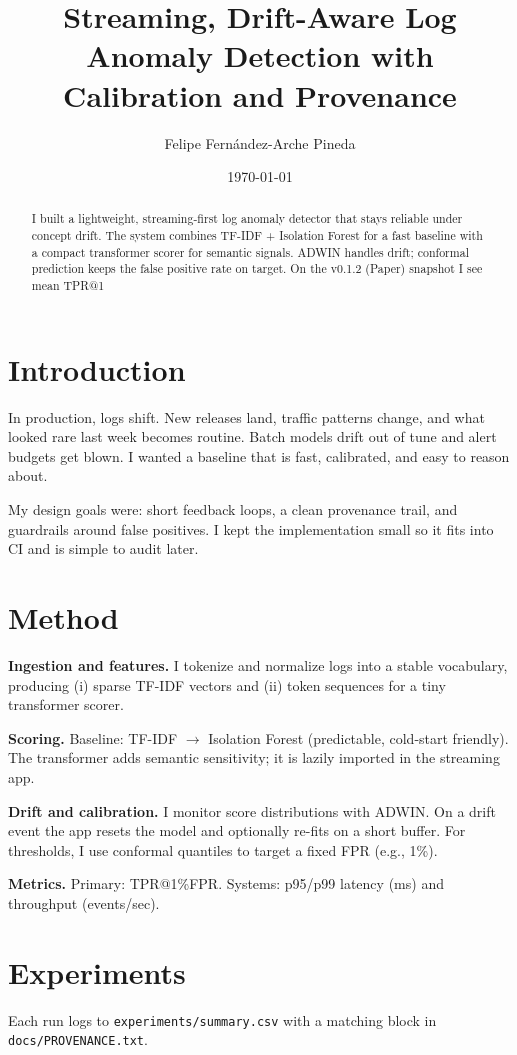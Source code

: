 \documentclass[11pt,twocolumn]{article}
\title{Streaming, Drift-Aware Log Anomaly Detection with Calibration and Provenance}
\author{Felipe Fernández-Arche Pineda}
\date{\today}
\begin{document}
\maketitle

\begin{abstract}
I built a lightweight, streaming-first log anomaly detector that stays reliable under concept drift. The system combines TF-IDF + Isolation Forest for a fast baseline with a compact transformer scorer for semantic signals. ADWIN handles drift; conformal prediction keeps the false positive rate on target. On the v0.1.2 (Paper) snapshot I see mean TPR@1%
\end{abstract}

\section{Introduction}
In production, logs shift. New releases land, traffic patterns change, and what looked rare last week becomes routine.
Batch models drift out of tune and alert budgets get blown. I wanted a baseline that is fast, calibrated, and easy to reason about.

My design goals were: short feedback loops, a clean provenance trail, and guardrails around false positives.
I kept the implementation small so it fits into CI and is simple to audit later.

\section{Method}
\textbf{Ingestion and features.} I tokenize and normalize logs into a stable vocabulary, producing (i) sparse TF-IDF vectors and (ii) token sequences for a tiny transformer scorer.

\textbf{Scoring.} Baseline: TF-IDF $\rightarrow$ Isolation Forest (predictable, cold-start friendly). The transformer adds semantic sensitivity; it is lazily imported in the streaming app.

\textbf{Drift and calibration.} I monitor score distributions with ADWIN. On a drift event the app resets the model and optionally re-fits on a short buffer.
For thresholds, I use conformal quantiles to target a fixed FPR (e.g., 1\%).

\textbf{Metrics.} Primary: TPR@1\%FPR. Systems: p95/p99 latency (ms) and throughput (events/sec).

\section{Experiments}
Each run logs to \texttt{experiments/summary.csv} with a matching block in \texttt{docs/PROVENANCE.txt}.
\end{document}
